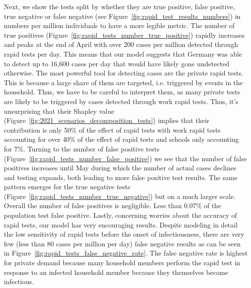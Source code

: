 Next, we show the tests split by whether they are true positive, false positive, true
negative or false negative (see Figure~\ref{fig:rapid_test_results_numbers}) in numbers
per million individuals to have a more legible metric.
The number of true positives (Figure~\ref{fig:rapid_tests_number_true_positive}) rapidly
increases and peaks at the end of April with over 200 cases per million detected through
rapid tests per day. This means that our model suggests that Germany was able to detect
up to 16,600 cases per day that would have likely gone undetected otherwise. The most
powerful tool for detecting cases are the private rapid tests. This is because a large
share of them are targeted, i.e. triggered by events in the household. Thus, we have to
be careful to interpret them, as many private tests are likely to be triggered by cases
detected through work rapid tests. Thus, it's unsurprising that their Shapley value
(Figure~\ref{fig:2021_scenarios_decomposition_tests}) implies that their contribution is
only 50\% of the effect of rapid tests with work rapid tests accounting for over 40\% of
the effect of rapid tests and schools only accounting for 7\%.
Turning to the number of false positive tests
(Figure~\ref{fig:rapid_tests_number_false_positive}) we see that the number of false
positives increases until May during which the number of actual cases declines and
testing expands, both leading to more false positive test results. The same pattern
emerges for the true negative tests (Figure~\ref{fig:rapid_tests_number_true_negative})
but on a much larger scale. Overall the number of false positives is negligible. Less
than 0.07\% of the population test false positive.
Lastly, concerning worries about the accuracy of rapid tests, our model has very
encouraging results. Despite modeling in detail the low sensitivity of rapid tests before
the onset of infectiousness, there are very few (less than 80 cases per million per day)
false negative results as can be seen in
Figure~\ref{fig:rapid_tests_false_negative_rate}. The false negative rate is highest for
private demand because many household members perform the rapid test in response to an
infected household member because they themselves become infectious.

